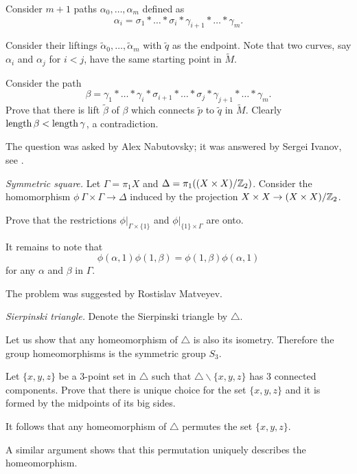 Consider $m+1$ paths $\alpha_0,\dots,\alpha_m$ defined as 
\[\alpha_i=\sigma_1{*}\dots{*}\sigma_i{*}\gamma_{i+1}{*}\dots{*}\gamma_m.\]

Consider their liftings $\tilde\alpha_0,\dots,\tilde\alpha_m$ 
with $\tilde q$ as the endpoint.
Note that two curves, say $\alpha_i$ and $\alpha_j$ for $i<j$, 
have the same starting point in $\tilde M$.

Consider the path
\[\beta=\gamma_1{*}\dots{*}\gamma_i{*}\sigma_{i+1}{*}\dots{*}\sigma_j{*}\gamma_{j+1}{*}\dots{*}\gamma_m.\]
Prove that there is lift $\tilde\beta$ of $\beta$ 
which connects $\tilde p$ to $\tilde q$ in $\tilde M$.
Clearly $\operatorname{\rm length} \beta<\operatorname{\rm length} \gamma$, a contradiction.

The question was asked by Alex Nabutovsky;
it was answered by Sergei Ivanov, see \cite{ivanov}.



\textit{Symmetric square.}
Let $\Gamma=\pi_1 X$ and $\Delta=\pi_1((X\times X)/\mathbb{Z}_2)$.
Consider the homomorphism $\phi\:\Gamma\times \Gamma\to \Delta$
induced by the projection $X\times X\to (X\times X)/\mathbb{Z}_2$.

Prove that the restrictions $\phi|_{\Gamma\times \{1\}}$ and $\phi|_{\{1\}\times\Gamma}$
are onto.

It remains to note that 
$$\phi(\alpha,1)\phi(1,\beta)=\phi(1,\beta)\phi(\alpha,1)$$
for any $\alpha$ and $\beta$ in $\Gamma$.

 The problem was suggested by Rostislav Matveyev.



\textit{Sierpinski triangle.}
Denote the Sierpinski triangle by $\triangle$.

Let us show that any homeomorphism of $\triangle$ is also its isometry.
Therefore the group homeomorphisms is the symmetric group $S_3$. 

Let $\{x,y,z\}$ be a 3-point set in $\triangle$ such that $\triangle \backslash\{x,y,z\}$ has 3 connected components.
Prove that there is unique choice for the set $\{x,y,z\}$ and 
it is formed by the midpoints of its big sides.

It follows that any homeomorphism of $\triangle$ permutes the set $\{x,y,z\}$.

A similar argument shows that this permutation  uniquely describes the homeomorphism.

